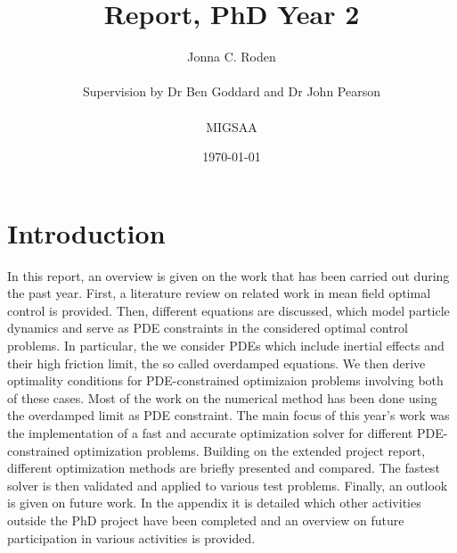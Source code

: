 \documentclass[11pt, a4paper]{article}
\title{Report, PhD Year 2}
\author{Jonna C. Roden\\ \\Supervision by Dr Ben Goddard and Dr John Pearson\\ \\ \vspace{0.5cm} MIGSAA}
\date{\today}
\theoremstyle{definition}
\begin{document}
	
	\maketitle
%		
%	
	\newpage
	\tableofcontents
	\newpage
















\section{Introduction}
In this report, an overview is given on the work that has been carried out during the past year. First, a literature review on related work in mean field optimal control is provided. Then, different equations are discussed, which model particle dynamics and serve as PDE constraints in the considered optimal control problems. In particular, the we consider PDEs which include inertial effects and their high friction limit, the so called overdamped equations. We then derive optimality conditions for PDE-constrained optimizaion problems involving both of these cases. Most of the work on the numerical method has been done using the overdamped limit as PDE constraint. 
The main focus of this year's work was the implementation of a fast and accurate optimization solver for different PDE-constrained optimization problems. Building on the extended project report, different optimization methods are briefly presented and compared. The fastest solver is then validated and applied to various test problems.
Finally, an outlook is given on future work. In the appendix it is detailed which other activities outside the PhD project have been completed and an overview on future participation in various activities is provided.
\end{document}
